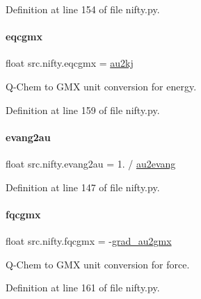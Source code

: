 Definition at line 154 of file nifty.\+py.

\mbox{\label{namespacesrc_1_1nifty_a336ab008c5b45507d15011307bb646fa}} 
\paragraph{\texorpdfstring{eqcgmx}{eqcgmx}}
{\footnotesize\ttfamily float src.\+nifty.\+eqcgmx = \hyperlink{namespacesrc_1_1nifty_af5788f33a1e5a2d91f1dba0b7dc00f3e}{au2kj}}



Q-\/\+Chem to G\+MX unit conversion for energy. 



Definition at line 159 of file nifty.\+py.

\mbox{\label{namespacesrc_1_1nifty_a6eaa0490a61cec15a40daef67e62ae95}} 
\paragraph{\texorpdfstring{evang2au}{evang2au}}
{\footnotesize\ttfamily float src.\+nifty.\+evang2au = 1. / \hyperlink{namespacesrc_1_1nifty_a2fa4528eeebf3c7353a157e6ac2a5256}{au2evang}}



Definition at line 147 of file nifty.\+py.

\mbox{\label{namespacesrc_1_1nifty_aa32fe291eb06cebb82b4fc736fbb7e1f}} 
\paragraph{\texorpdfstring{fqcgmx}{fqcgmx}}
{\footnotesize\ttfamily float src.\+nifty.\+fqcgmx = -\/\hyperlink{namespacesrc_1_1nifty_a829aae1bd9a882de17c5348ecbc4a5b4}{grad\+\_\+au2gmx}}



Q-\/\+Chem to G\+MX unit conversion for force. 



Definition at line 161 of file nifty.\+py.

